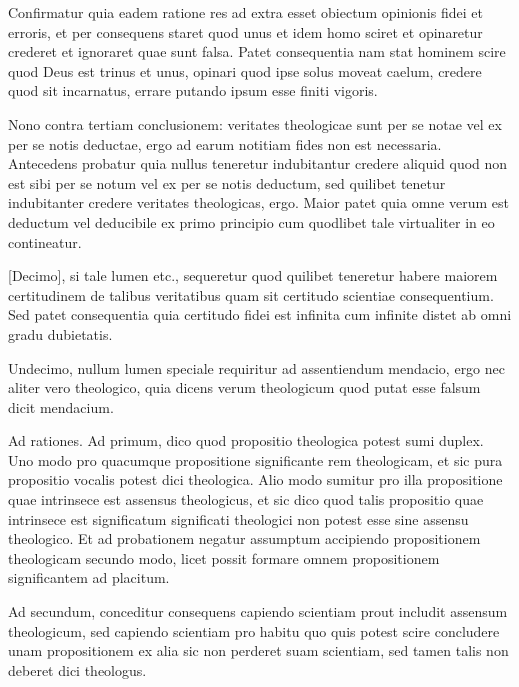 \documentclass[twoside, openright]{article}
\begin{document}
        \pstart
        Confirmatur quia eadem ratione res ad extra esset obiectum opinionis fidei et erroris, et per consequens staret quod unus et idem homo sciret et opinaretur crederet et ignoraret quae sunt falsa. Patet consequentia nam stat hominem scire quod Deus est trinus et unus, opinari quod ipse solus moveat caelum, credere quod sit incarnatus, errare putando ipsum esse finiti vigoris.
        \pend
     
        \pstart
        Nono contra tertiam conclusionem: veritates theologicae sunt per se notae vel ex per se notis deductae, ergo ad earum notitiam fides non est necessaria. Antecedens probatur quia nullus teneretur indubitantur credere aliquid quod non est sibi per se notum vel ex per se notis deductum, sed quilibet tenetur indubitanter credere veritates theologicas, ergo. Maior patet quia omne verum est deductum vel deducibile ex primo principio cum quodlibet tale virtualiter in eo contineatur.
        \pend
     
        \pstart
        [Decimo], si tale lumen etc., sequeretur quod quilibet teneretur habere maiorem certitudinem de talibus veritatibus quam sit certitudo scientiae consequentium. Sed patet consequentia quia certitudo fidei est infinita cum infinite distet ab omni gradu dubietatis.
        \pend
     
        \pstart
        Undecimo, nullum lumen speciale requiritur ad assentiendum mendacio, ergo nec aliter vero theologico, quia dicens verum theologicum quod putat esse falsum dicit mendacium.
        \pend
     
        \pstart
        Ad rationes. Ad primum, dico quod propositio theologica potest sumi duplex. Uno modo pro quacumque propositione significante rem theologicam, et sic pura propositio vocalis potest dici theologica. Alio modo sumitur pro illa propositione quae intrinsece est assensus theologicus, et sic dico quod talis propositio quae intrinsece est significatum significati theologici non potest esse sine assensu theologico. Et ad probationem negatur assumptum accipiendo propositionem theologicam secundo modo, licet possit formare omnem propositionem significantem ad placitum.
        \pend
     
        \pstart
        Ad secundum, conceditur consequens capiendo scientiam prout includit assensum theologicum, sed capiendo scientiam pro habitu quo quis potest scire concludere unam propositionem ex alia sic non perderet suam scientiam, sed tamen talis non deberet dici theologus.
        \pend
     
\end{document}
